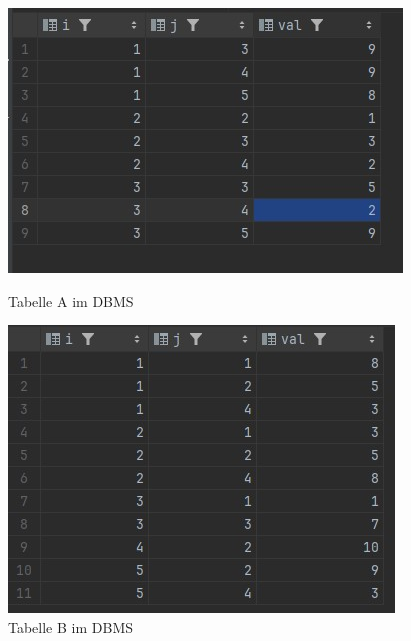 \documentclass[11pt]{scrartcl}
\begin{document}
\begin{figure}[H]
    \begin{minipage}[b]{.4\linewidth}
        \begin{center}
            \includegraphics[width=\linewidth]{table_matrix_a.jpg}
        \end{center}
        \caption{Tabelle A im DBMS}
    \end{minipage}
    \hspace{.1\linewidth}
    \begin{minipage}[b]{.4\linewidth}
        \begin{center}
            \includegraphics[width=\linewidth]{table_matrix_b.jpg}
        \end{center}
        \caption{Tabelle B im DBMS}
    \end{minipage}
\end{figure}
\end{document}
